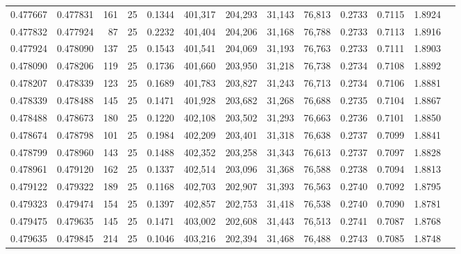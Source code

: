 \begin{tabular}{rrrrrrrrrrrrr}
0.477667 & 0.477831 &   161 &  25 &                                     0.1344 & 401,317 & 204,293 &  31,143 &  76,813 & 0.2733 & 0.7115 & 1.8924 \\
0.477832 & 0.477924 &    87 &  25 &                                     0.2232 & 401,404 & 204,206 &  31,168 &  76,788 & 0.2733 & 0.7113 & 1.8916 \\
0.477924 & 0.478090 &   137 &  25 &                                     0.1543 & 401,541 & 204,069 &  31,193 &  76,763 & 0.2733 & 0.7111 & 1.8903 \\
0.478090 & 0.478206 &   119 &  25 &                                     0.1736 & 401,660 & 203,950 &  31,218 &  76,738 & 0.2734 & 0.7108 & 1.8892 \\
0.478207 & 0.478339 &   123 &  25 &                                     0.1689 & 401,783 & 203,827 &  31,243 &  76,713 & 0.2734 & 0.7106 & 1.8881 \\
0.478339 & 0.478488 &   145 &  25 &                                     0.1471 & 401,928 & 203,682 &  31,268 &  76,688 & 0.2735 & 0.7104 & 1.8867 \\
0.478488 & 0.478673 &   180 &  25 &                                     0.1220 & 402,108 & 203,502 &  31,293 &  76,663 & 0.2736 & 0.7101 & 1.8850 \\
0.478674 & 0.478798 &   101 &  25 &                                     0.1984 & 402,209 & 203,401 &  31,318 &  76,638 & 0.2737 & 0.7099 & 1.8841 \\
0.478799 & 0.478960 &   143 &  25 &                                     0.1488 & 402,352 & 203,258 &  31,343 &  76,613 & 0.2737 & 0.7097 & 1.8828 \\
0.478961 & 0.479120 &   162 &  25 &                                     0.1337 & 402,514 & 203,096 &  31,368 &  76,588 & 0.2738 & 0.7094 & 1.8813 \\
0.479122 & 0.479322 &   189 &  25 &                                     0.1168 & 402,703 & 202,907 &  31,393 &  76,563 & 0.2740 & 0.7092 & 1.8795 \\
0.479323 & 0.479474 &   154 &  25 &                                     0.1397 & 402,857 & 202,753 &  31,418 &  76,538 & 0.2740 & 0.7090 & 1.8781 \\
0.479475 & 0.479635 &   145 &  25 &                                     0.1471 & 403,002 & 202,608 &  31,443 &  76,513 & 0.2741 & 0.7087 & 1.8768 \\
0.479635 & 0.479845 &   214 &  25 &                                     0.1046 & 403,216 & 202,394 &  31,468 &  76,488 & 0.2743 & 0.7085 & 1.8748 \\

\end{tabular}
